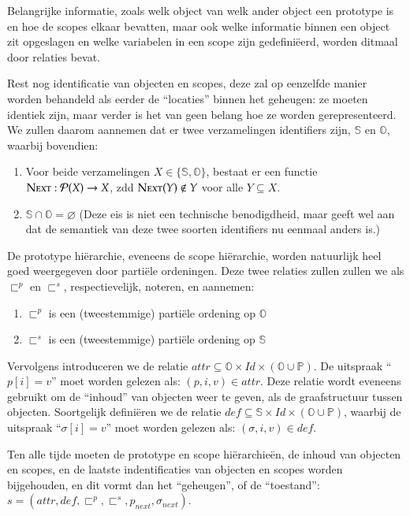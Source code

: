 \documentclass[11pt,oneside,parskip=half]{scrbook}
\newcommand{\<}
  {\ensuremath{\langle}}
\renewcommand{\>}
  {\ensuremath{\rangle}}
\def\Proto{\sqsubset^p}
\def\Outer{\sqsubset^s}
\def\Attr{\mathit{attr}}
\def\SDef{\mathit{def}}
\begin{document}
Belangrijke informatie, zoals welk object van welk ander object een prototype is en hoe de scopes elkaar bevatten, maar ook welke informatie binnen een object zit opgeslagen en welke variabelen in een scope zijn gedefiniëerd, worden ditmaal door relaties bevat.

Rest nog identificatie van objecten en scopes, deze zal op eenzelfde manier worden behandeld als eerder de ``locaties'' binnen het geheugen: ze moeten identiek zijn, maar verder is het van geen belang hoe ze worden gerepresenteerd. We zullen daarom aannemen dat er twee verzamelingen identifiers zijn, $\mathbb{S}$ en $\mathbb{O}$, waarbij bovendien:

\begin{enumerate}
	\item Voor beide verzamelingen $X \in \{\mathbb{S}, \mathbb{O}\}$, bestaat er een functie $\textsc{Next}:\mathcal{P}(X) \to X$, zdd $\textsc{Next}(Y) \notin Y$ voor alle $Y \subseteq X$.
	\item $\mathbb{S} \cap \mathbb{O} = \varnothing$ (Deze eis is niet een technische benodigdheid, maar geeft wel aan dat de semantiek van deze twee soorten identifiers nu eenmaal anders is.)
\end{enumerate}

De prototype hiërarchie, eveneens de scope hiërarchie, worden natuurlijk heel goed weergegeven door partiële ordeningen. Deze twee relaties zullen zullen we als $\Proto$ en $\Outer$, respectievelijk, noteren, en aannemen:

\begin{enumerate}
	\item $\Proto$ is een (tweestemmige) partiële ordening op $\mathbb{O}$
	\item $\Outer$ is een (tweestemmige) partiële ordening op $\mathbb{S}$
\end{enumerate}

Vervolgens introduceren we de relatie $\Attr \subseteq \mathbb{O} \times \mathit{Id} \times (\mathbb{O} \cup \mathbb{P})$. De uitspraak ``$p[i] = v$'' moet worden gelezen als: $(p, i, v) \in \Attr$. Deze relatie wordt eveneens gebruikt om de ``inhoud'' van objecten weer te geven, als de graafstructuur tussen objecten. Soortgelijk definiëren we de relatie $\SDef \subseteq \mathbb{S} \times \mathit{Id} \times (\mathbb{O} \cup \mathbb{P})$, waarbij de uitspraak ``$\sigma[i] = v$'' moet worden gelezen als: $(\sigma, i, v) \in \SDef$.

Ten alle tijde moeten de prototype en scope hiërarchieën, de inhoud van objecten en scopes, en de laatste indentificaties van objecten en scopes worden bijgehouden, en dit vormt dan het ``geheugen'', of de ``toestand'': $s = (\Attr, \SDef, \Proto, \Outer, p_\mathit{next}, \sigma_\mathit{next})$.
\end{document}
